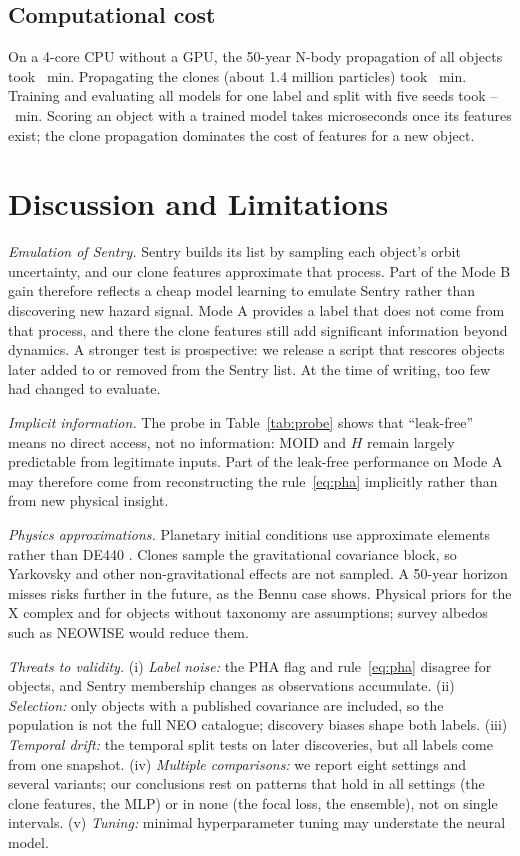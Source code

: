 \documentclass[journal]{IEEEtran}
\begin{document}
\subsection{Computational cost}
On a 4-core CPU without a GPU, the 50-year N-body propagation of all objects took \WallStageTwo~min. Propagating the clones (about 1.4 million particles) took \WallStageThree~min. Training and evaluating all models for one label and split with five seeds took \WallEvalMin--\WallEvalMax~min. Scoring an object with a trained model takes microseconds once its features exist; the clone propagation dominates the cost of features for a new object.

\section{Discussion and Limitations}\label{sec:discussion}
\emph{Emulation of Sentry.} Sentry builds its list by sampling each object's orbit uncertainty, and our clone features approximate that process. Part of the Mode B gain therefore reflects a cheap model learning to emulate Sentry rather than discovering new hazard signal. Mode A provides a label that does not come from that process, and there the clone features still add significant information beyond dynamics. A stronger test is prospective: we release a script that rescores objects later added to or removed from the Sentry list. At the time of writing, too few had changed to evaluate.

\emph{Implicit information.} The probe in Table~\ref{tab:probe} shows that ``leak-free'' means no direct access, not no information: MOID and $H$ remain largely predictable from legitimate inputs. Part of the leak-free performance on Mode A may therefore come from reconstructing the rule~\eqref{eq:pha} implicitly rather than from new physical insight.

\emph{Physics approximations.} Planetary initial conditions use approximate elements rather than DE440 \cite{park2021}. Clones sample the gravitational covariance block, so Yarkovsky and other non-gravitational effects \cite{bottke2006} are not sampled. A 50-year horizon misses risks further in the future, as the Bennu case shows. Physical priors for the X complex and for objects without taxonomy are assumptions; survey albedos such as NEOWISE \cite{mainzer2011} would reduce them.

\emph{Threats to validity.} (i) \emph{Label noise:} the PHA flag and rule~\eqref{eq:pha} disagree for \NPhaDisagree{} objects, and Sentry membership changes as observations accumulate. (ii) \emph{Selection:} only objects with a published covariance are included, so the population is not the full NEO catalogue; discovery biases \cite{granvik2018} shape both labels. (iii) \emph{Temporal drift:} the temporal split tests on later discoveries, but all labels come from one snapshot. (iv) \emph{Multiple comparisons:} we report eight settings and several variants; our conclusions rest on patterns that hold in all settings (the clone features, the MLP) or in none (the focal loss, the ensemble), not on single intervals. (v) \emph{Tuning:} minimal hyperparameter tuning may understate the neural model.
\end{document}
